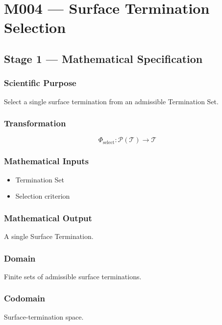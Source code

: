 \chapter{M004 --- Surface Termination Selection}

\section{Stage 1 --- Mathematical Specification}

\subsection{Scientific Purpose}

Select a single surface termination from an admissible Termination Set.

\subsection{Transformation}

\[
\Phi_{\mathrm{select}}:
\mathcal{P}(\mathcal{T})
\rightarrow
\mathcal{T}
\]

\subsection{Mathematical Inputs}

\begin{itemize}
\item Termination Set
\item Selection criterion
\end{itemize}

\subsection{Mathematical Output}

A single Surface Termination.

\subsection{Domain}

Finite sets of admissible surface terminations.

\subsection{Codomain}

Surface-termination space.

